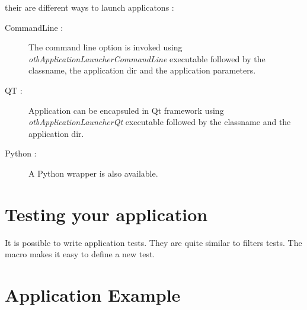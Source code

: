 their are different ways to launch applicatons :

\begin{description}
\item[CommandLine :] The command line option is invoked using \emph{otbApplicationLauncherCommandLine} executable followed by the classname, the application dir and the application parameters.
\item[QT :] Application can be encapsuled in Qt framework using \emph{otbApplicationLauncherQt} executable followed by the classname and the application dir.
\item[Python :] A Python wrapper is also available.
\end{description}


\section{Testing your application}
\label{sec:appTesting}
It is possible to write application tests. They are quite similar to filters tests.
The macro  makes it easy to define a new test.


\section{Application Example}
\label{sec:ApplicationExample}
\ifitkFullVersion

\fi

